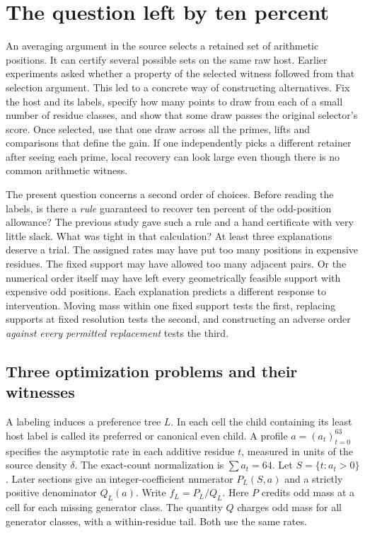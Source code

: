 \section{The question left by ten percent}
\label{sec:question}
An averaging argument in the source selects a retained set of arithmetic positions. It can certify several possible sets on the same raw host. Earlier experiments asked whether a property of the selected witness followed from that selection argument. This led to a concrete way of constructing alternatives. Fix the host and its labels, specify how many points to draw from each of a small number of residue classes, and show that some draw passes the original selector's score. Once selected, use that one draw across all the primes, lifts and comparisons that define the gain. If one independently picks a different retainer after seeing each prime, local recovery can look large even though there is no common arithmetic witness.

The present question concerns a second order of choices. Before reading the labels, is there a \emph{rule} guaranteed to recover ten percent of the odd-position allowance? The previous study gave such a rule and a hand certificate with very little slack. What was tight in that calculation? At least three explanations deserve a trial. The assigned rates may have put too many positions in expensive residues. The fixed support may have allowed too many adjacent pairs. Or the numerical order itself may have left every geometrically feasible support with expensive odd positions. Each explanation predicts a different response to intervention. Moving mass within one fixed support tests the first, replacing supports at fixed resolution tests the second, and constructing an adverse order \emph{against every permitted replacement} tests the third.

\subsection{Three optimization problems and their witnesses}
A labeling induces a preference tree \(L\). In each cell the child containing its least host label is called its preferred or canonical even child. A profile \(a=(a_t)_{t=0}^{63}\) specifies the asymptotic rate in each additive residue \(t\), measured in units of the source density \(\delta\). The exact-count normalization is \(\sum a_t=64\). Let \(S=\{t:a_t>0\}\). Later sections give an integer-coefficient numerator \(P_L(S,a)\) and a strictly positive denominator \(Q_L(a)\). Write \(f_L=P_L/Q_L\). Here \(P\) credits odd mass at a cell for each missing generator class. The quantity \(Q\) charges odd mass for all generator classes, with a within-residue tail. Both use the same rates.


